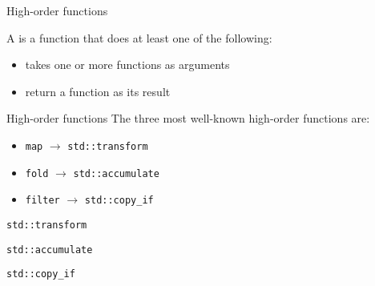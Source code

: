 \begin{frame}{High-order functions}{}
  \begin{definition}
    A  is a function that does at least one of the following:
    \begin{itemize}
    \item
      takes one or more functions as arguments
    \item
      return a function as its result
    \end{itemize}
  \end{definition}
  \begin{block}{High-order functions}
    The three most well-known high-order functions are:
    \begin{itemize}
    \item
      \texttt{map} $\to$ \lstinline!std::transform!
    \item
      \texttt{fold} $\to$ \lstinline!std::accumulate!
    \item
      \texttt{filter} $\to$ \lstinline!std::copy_if!
    \end{itemize}
  \end{block}
\end{frame}

\begin{frame}{\texttt{std::transform}}{}
  \begin{example}
  \end{example}
\end{frame}

\begin{frame}{\texttt{std::accumulate}}{}
  \begin{example}
  \end{example}
\end{frame}

\begin{frame}{\texttt{std::copy\_if}}{}
  \begin{example}
  \end{example}
\end{frame}


